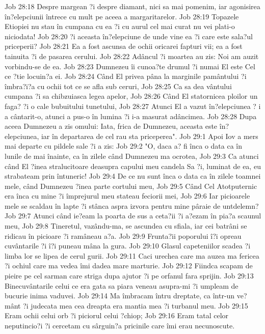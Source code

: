 Job 28:18  Despre margean ?i despre diamant, nici sa mai pomenim, iar agonisirea în?elepciunii întrece cu mult pe aceea a margaritarelor.
Job 28:19  Topazele Etiopiei nu stau în cumpana cu ea ?i cu aurul cel mai curat nu vei plati-o niciodata!
Job 28:20  ?i aceasta în?elepciune de unde vine ea ?i care este sala?ul priceperii?
Job 28:21  Ea a fost ascunsa de ochii oricarei fapturi vii; ea a fost tainuita ?i de pasarea cerului.
Job 28:22  Adâncul ?i moartea au zis: Noi am auzit vorbindu-se de ea.
Job 28:23  Dumnezeu îi cunoa?te drumul ?i numai El este Cel ce ?tie locuin?a ei.
Job 28:24  Când El privea pâna la marginile pamântului ?i îmbra?i?a cu ochii tot ce se afla sub ceruri,
Job 28:25  Ca sa dea vântului cumpana ?i sa chibzuiasca legea apelor,
Job 28:26  Când El statornicea ploilor un faga? ?i o cale bubuitului tunetului,
Job 28:27  Atunci El a vazut în?elepciunea ? i a cântarit-o, atunci a pus-o în lumina ?i i-a masurat adâncimea.
Job 28:28  Dupa aceea Dumnezeu a zis omului: Iata, frica de Dumnezeu, aceasta este în?elepciunea, iar în departarea de cel rau sta priceperea".
Job 29:1  Apoi Iov a mers mai departe cu pildele sale ?i a zis:
Job 29:2  "O, daca a? fi înca o data ca în lunile de mai înainte, ca în zilele când Dumnezeu ma ocrotea,
Job 29:3  Ca atunci când El ?inea stralucitoare deasupra capului meu candela Sa ?i, luminat de ea, eu strabateam prin întuneric!
Job 29:4  De ce nu sunt înca o data ca în zilele toamnei mele, când Dumnezeu ?inea parte cortului meu,
Job 29:5  Când Cel Atotputernic era înca cu mine ?i împrejurul meu stateau feciorii mei,
Job 29:6  Iar picioarele mele se scaldau în lapte ?i stânca aspra izvora pentru mine pâraie de untdelemn?
Job 29:7  Atunci când ie?eam la poarta de sus a ceta?ii ?i a?ezam în pia?a scaunul meu,
Job 29:8  Tineretul, vazându-ma, se ascundea cu sfiala, iar cei batrâni se ridicau în picioare ?i ramâneau a?a.
Job 29:9  Frunta?ii poporului î?i opreau cuvântarile ?i î?i puneau mâna la gura.
Job 29:10  Glasul capeteniilor scadea ?i limba lor se lipea de cerul gurii.
Job 29:11  Caci urechea care ma auzea ma fericea ?i ochiul care ma vedea îmi dadea mare marturie.
Job 29:12  Fiindca scapam de pieire pe cel sarman care striga dupa ajutor ?i pe orfanul fara sprijin.
Job 29:13  Binecuvântarile celui ce era gata sa piara veneau asupra-mi ?i umpleam de bucurie inima vaduvei.
Job 29:14  Ma îmbracam întru dreptate, ca într-un ve?mânt ?i judecata mea cea dreapta era mantia mea ?i turbanul meu.
Job 29:15  Eram ochii celui orb ?i piciorul celui ?chiop;
Job 29:16  Eram tatal celor neputincio?i ?i cercetam cu sârguin?a pricinile care îmi erau necunoscute.
